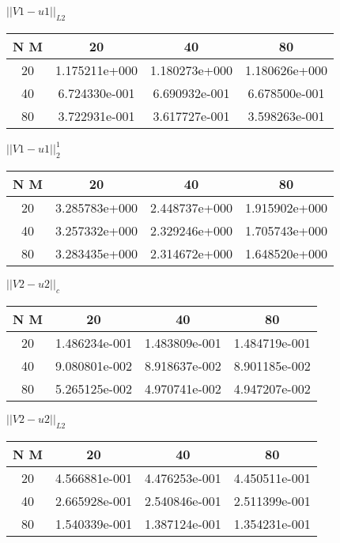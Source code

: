 \begin{center}
	$||V1 - u1||_{L2}$
	\begin{tabular}{|c|c|c|c|}
		\hline 
		N  M& 20& 40& 80\\ 
		\hline 
		20 & 1.175211e+000 & 1.180273e+000 & 1.180626e+000 \\ \hline 
		40 & 6.724330e-001 & 6.690932e-001 & 6.678500e-001 \\ \hline 
		80 & 3.722931e-001 & 3.617727e-001 & 3.598263e-001 \\ \hline 
		\hline 
	\end{tabular} 
\end{center} 
\begin{center}
	$||V1 - u1||_{2}^1$
	\begin{tabular}{|c|c|c|c|}
		\hline 
		N  M& 20& 40& 80\\ 
		\hline 
		20 & 3.285783e+000 & 2.448737e+000 & 1.915902e+000 \\ \hline 
		40 & 3.257332e+000 & 2.329246e+000 & 1.705743e+000 \\ \hline 
		80 & 3.283435e+000 & 2.314672e+000 & 1.648520e+000 \\ \hline 
		\hline 
	\end{tabular} 
\end{center} 
\begin{center}
	$||V2 - u2||_c$
	\begin{tabular}{|c|c|c|c|}
		\hline 
		N  M& 20& 40& 80\\ 
		\hline 
		20 & 1.486234e-001 & 1.483809e-001 & 1.484719e-001 \\ \hline 
		40 & 9.080801e-002 & 8.918637e-002 & 8.901185e-002 \\ \hline 
		80 & 5.265125e-002 & 4.970741e-002 & 4.947207e-002 \\ \hline 
		\hline 
	\end{tabular} 
\end{center} 
\begin{center}
	$||V2 - u2||_{L2}$
	\begin{tabular}{|c|c|c|c|}
		\hline 
		N  M& 20& 40& 80\\ 
		\hline 
		20 & 4.566881e-001 & 4.476253e-001 & 4.450511e-001 \\ \hline 
		40 & 2.665928e-001 & 2.540846e-001 & 2.511399e-001 \\ \hline 
		80 & 1.540339e-001 & 1.387124e-001 & 1.354231e-001 \\ \hline 
		\hline 
	\end{tabular} 
\end{center} 
